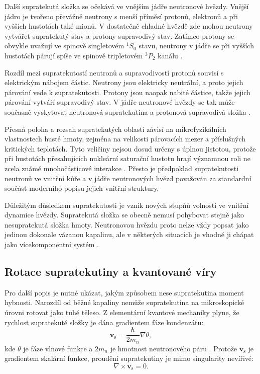 \documentclass[%
final%
,htext%
]{ipothes}
\begin{document}
Další supratekutá složka se očekává ve vnějším jádře neutronové hvězdy. Vnější jádro je tvořeno převážně neutrony s menší příměsí protonů, elektronů a při vyšších hustotách také mionů. V dostatečně chladné hvězdě zde mohou neutrony vytvářet supratekutý stav a protony supravodivý stav. Zatímco protony se obvykle uvažují ve spinově singletovém $^1S_0$ stavu, neutrony v jádře se při vyšších hustotách párují spíše ve spinově tripletovém $^3P_2$ kanálu \cite{ascenzi2024}.

Rozdíl mezi supratekutostí neutronů a supravodivostí protonů souvisí s elektrickým nábojem částic. Neutrony jsou elektricky neutrální, a proto jejich párování vede k supratekutosti. Protony jsou naopak nabité částice, takže jejich párování vytváří supravodivý stav. V jádře neutronové hvězdy se tak může současně vyskytovat neutronová supratekutina a protonová supravodivá složka \cite{ghosh2007}.

Přesná poloha a rozsah supratekutých oblastí závisí na mikrofyzikálních vlastnostech husté hmoty, zejména na velikosti párovacích mezer a příslušných kritických teplotách. Tyto veličiny nejsou dosud určeny s úplnou jistotou, protože při hustotách přesahujících nukleární saturační hustotu hrají významnou roli ne zcela známé mnohočásticové interakce \cite{ascenzi2024}. Přesto je předpoklad supratekutosti neutronů ve vnitřní kůře a v jádře neutronových hvězd považován za standardní součást moderního popisu jejich vnitřní struktury.

Důležitým důsledkem supratekutosti je vznik nových stupňů volnosti ve vnitřní dynamice hvězdy. Supratekutá složka se obecně nemusí pohybovat stejně jako nesupratekutá složka hmoty. Neutronovou hvězdu proto nelze vždy popsat jako jedinou dokonale vázanou kapalinu, ale v některých situacích je vhodné ji chápat jako vícekomponentní systém \cite{andersson2021}.


\subsection{Rotace supratekutiny a kvantované víry}

Pro další popis je nutné ukázat, jakým způsobem nese supratekutina moment hybnosti. Narozdíl od běžné kapaliny nemůže supratekutina na mikroskopické úrovni rotovat jako tuhé těleso. Z elementární kvantové mechaniky plyne, že rychlost supratekuté složky je dána gradientem fáze kondenzátu:
\begin{equation}
    \mathbf{v}_{\mathrm{s}}
    =
    \frac{\hbar}{2m_n}\nabla \theta,
    \label{eq:superfluid_velocity}
\end{equation}
kde $\theta$ je fáze vlnové funkce a $2m_n$ je hmotnost neutronového páru \cite{ghosh2007}. Protože $\mathbf{v}_{\mathrm{s}}$ je gradientem skalární funkce, proudění supratekutiny je mimo singularity nevířivé:
\begin{equation}
    \nabla \times \mathbf{v}_{\mathrm{s}} = 0.
    \label{eq:irrotational_flow}
\end{equation}
\end{document}
